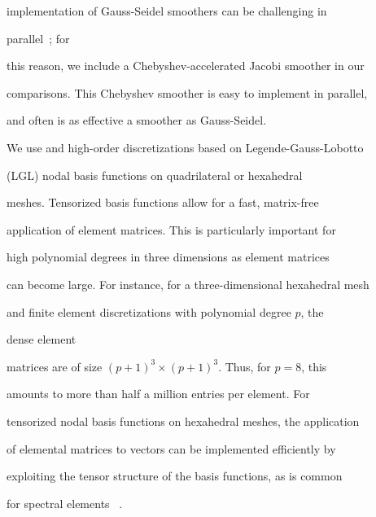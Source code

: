 \documentclass[smallcondensed,final]{svjour3}     %
\newcommand{\todo}[1]{\textcolor{red}{ #1}}
\begin{document}
implementation of Gauss-Seidel smoothers can be challenging in

parallel~\cite{AdamsBrezinaHuEtAl03, BakerFalgoutKolevEtAl11}; for

this reason, we include a Chebyshev-accelerated Jacobi smoother in our

comparisons. This Chebyshev smoother is easy to implement in parallel,

and often is as effective a smoother as Gauss-Seidel.










We use and high-order discretizations based on Legende-Gauss-Lobotto

(LGL) nodal basis functions on quadrilateral or hexahedral

meshes. Tensorized basis functions allow for a fast, matrix-free

application of element matrices. This is particularly important for

high polynomial degrees in three dimensions as element matrices

can become large. For instance, for a three-dimensional hexahedral mesh

and finite element discretizations with polynomial degree $p$, the

dense element

matrices are of size $(p+1)^3\times (p+1)^3$. Thus, for $p=8$, this

amounts to more than half a million entries per element.  For

tensorized nodal basis functions on hexahedral meshes, the application

of elemental matrices to vectors can be implemented efficiently by

exploiting the tensor structure of the basis functions, as is common

for spectral elements ~\cite{DevilleFischerMund02}.

\end{document}
